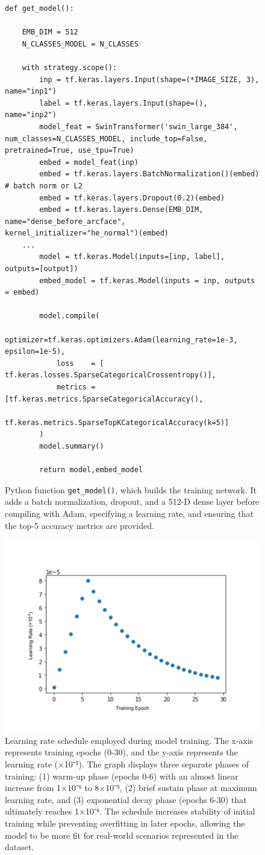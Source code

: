 \documentclass[twocolumn]{article}
\begin{document}
\begin{figure}[H]
\begin{minipage}{1.05\linewidth}
\begin{lstlisting}
def get_model():

    EMB_DIM = 512
    N_CLASSES_MODEL = N_CLASSES

    with strategy.scope():
        inp = tf.keras.layers.Input(shape=(*IMAGE_SIZE, 3), name="inp1")
        label = tf.keras.layers.Input(shape=(), name="inp2")
        model_feat = SwinTransformer('swin_large_384', num_classes=N_CLASSES_MODEL, include_top=False, pretrained=True, use_tpu=True)
        embed = model_feat(inp)
        embed = tf.keras.layers.BatchNormalization()(embed) # batch norm or L2
        embed = tf.keras.layers.Dropout(0.2)(embed)
        embed = tf.keras.layers.Dense(EMB_DIM, name="dense_before_arcface", kernel_initializer="he_normal")(embed)
    ...
        model = tf.keras.Model(inputs=[inp, label], outputs=[output])
        embed_model = tf.keras.Model(inputs = inp, outputs = embed)

        model.compile(
            optimizer=tf.keras.optimizers.Adam(learning_rate=1e-3, epsilon=1e-5),
            loss    = [ tf.keras.losses.SparseCategoricalCrossentropy()],
            metrics = [tf.keras.metrics.SparseCategoricalAccuracy(),
                       tf.keras.metrics.SparseTopKCategoricalAccuracy(k=5)]
        )
        model.summary()
        
        return model,embed_model
\end{lstlisting}
\end{minipage}
\caption{Python function \texttt{get_model()}, which builds the training network. It adds a batch normalization, dropout, and a 512-D dense layer before compiling with Adam, specifying a learning rate, and ensuring that the top-5 accuracy metrics are provided.}
\end{figure}

\begin{figure}[H]
    \centering
    \includegraphics[width=0.5\linewidth]{learning.png}
    \caption{Learning rate schedule employed during model training. The x-axis represents training epochs (0-30), and the y-axis represents the learning rate (×10⁻⁵). The graph displays three separate phases of training: (1) warm-up phase (epochs 0-6) with an almost linear increase from 1×10⁻⁶ to 8×10⁻⁵, (2) brief sustain phase at maximum learning rate, and (3) exponential decay phase (epochs 6-30) that ultimately reaches 1×10⁻⁶. The schedule increases stability of initial training while preventing overfitting in later epochs, allowing the model to be more fit for real-world scenarios represented in the dataset.}
\end{figure}
\end{document}
